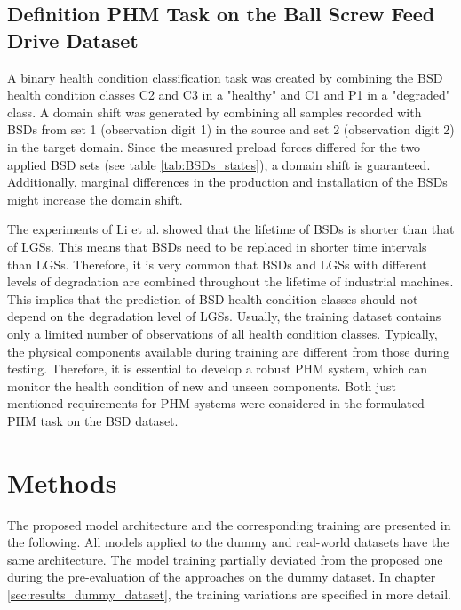 \subsection{Definition PHM Task on the Ball Screw Feed Drive Dataset}\label{ch:PHM_Task_Definition}
A binary health condition classification task was created by combining the BSD health condition classes C2 and C3 in a "healthy" and C1 and P1 in a "degraded" class. A domain shift was generated by combining all samples recorded with BSDs from set 1 (observation digit 1) in the source and set 2 (observation digit 2) in the target domain. Since the measured preload forces differed for the two applied BSD sets (see table \ref{tab:BSDs_states}), a domain shift is guaranteed. Additionally, marginal differences in the production and installation of the BSDs might increase the domain shift.

The experiments of Li et al. \cite{Li2018} showed that the lifetime of BSDs is shorter than that of LGSs. This means that BSDs need to be replaced in shorter time intervals than LGSs. Therefore, it is very common that BSDs and LGSs with different levels of degradation are combined throughout the lifetime of industrial machines. This implies that the prediction of BSD health condition classes should not depend on the degradation level of LGSs. Usually, the training dataset contains only a limited number of observations of all health condition classes. Typically, the physical components available during training are different from those during testing. Therefore, it is essential to develop a robust PHM system, which can monitor the health condition of new and unseen components. Both just mentioned requirements for PHM systems were considered in the formulated PHM task on the BSD dataset.

\section{Methods}\label{sec:methods}
The proposed model architecture and the corresponding training are presented in the following. All models applied to the dummy and real-world datasets have the same architecture. The model training partially deviated from the proposed one during the pre-evaluation of the approaches on the dummy dataset. In chapter \ref{sec:results_dummy_dataset}, the training variations are specified in more detail. 

